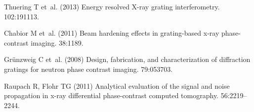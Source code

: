 \documentclass{pnastwo}
\begin{document}
\begin{article}
\begin{thebibliography}{10}
Thuering T et~al. (2013) {Energy resolved X-ray grating interferometry}.
 102:191113.

Chabior M et~al. (2011) {Beam hardening effects in grating-based x-ray
  phase-contrast imaging}.
 38:1189.

Gr\"{u}nzweig C et~al. (2008) {Design, fabrication, and characterization of
  diffraction gratings for neutron phase contrast imaging.}
 79:053703.

Raupach R, Flohr TG (2011) {Analytical evaluation of the signal and noise
  propagation in x-ray differential phase-contrast computed tomography.}
 56:2219--2244.

\end{thebibliography}

\end{article}






\end{document}
